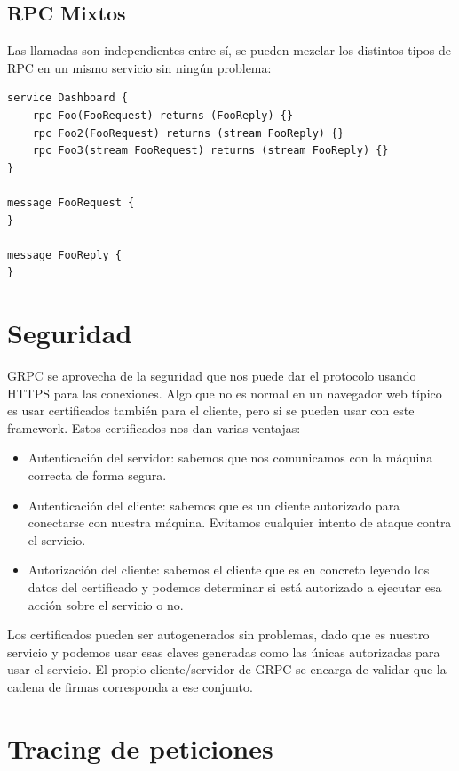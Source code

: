 \subsection{RPC Mixtos}
\label{subsec:mixed-rpc}

Las llamadas son independientes entre sí, se pueden mezclar los distintos tipos de RPC en un mismo servicio sin ningún problema:

\begin{verbatim}
service Dashboard {
    rpc Foo(FooRequest) returns (FooReply) {}
    rpc Foo2(FooRequest) returns (stream FooReply) {}
    rpc Foo3(stream FooRequest) returns (stream FooReply) {}
}

message FooRequest {
}

message FooReply {
}
\end{verbatim}

\section{Seguridad}
\label{sec:grpc-security}

GRPC se aprovecha de la seguridad que nos puede dar el protocolo usando HTTPS para las conexiones. Algo que no es normal en un navegador web típico es usar certificados también para el cliente, pero si se pueden usar con este framework. Estos certificados nos dan varias ventajas:
\begin{itemize}
    \item Autenticación del servidor: sabemos que nos comunicamos con la máquina correcta de forma segura.
    \item Autenticación del cliente: sabemos que es un cliente autorizado para conectarse con nuestra máquina. Evitamos cualquier intento de ataque contra el servicio.
    \item Autorización del cliente: sabemos el cliente que es en concreto leyendo los datos del certificado y podemos determinar si está autorizado a ejecutar esa acción sobre el servicio o no.
\end{itemize}

Los certificados pueden ser autogenerados sin problemas, dado que es nuestro servicio y podemos usar esas claves generadas como las únicas autorizadas para usar el servicio. El propio cliente/servidor de GRPC se encarga de validar que la cadena de firmas corresponda a ese conjunto.

\section{Tracing de peticiones}
\label{sec:trace}

